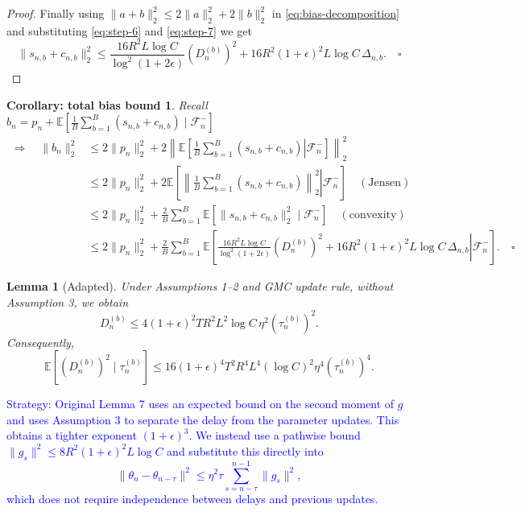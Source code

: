 \documentclass[10pt]{article}
\newcommand{\E}{\mathbb{E}}
\newcommand{\F}{\mathcal{F}}
\theoremstyle{preserved}
\newtheorem{lemma}{Lemma}
\newtheorem*{corollary}{Corollary: total bias bound}
\begin{document}
\begin{proof}
Finally using $\|a+b\|_2^2\le2\|a\|_2^2+2\|b\|_2^2$ in \eqref{eq:bias-decomposition} and substituting \eqref{eq:step-6} and \eqref{eq:step-7} we get
\begin{equation*}
\|s_{n,b}+c_{n,b}\|_2^2\le\frac{16R^2L\log C}{\log^2(1+2\epsilon)}(D_n^{(b)})^2+16R^2(1+\epsilon)^2L\log C\,\Delta_{n,b}.\quad\square
\end{equation*}
\end{proof}

\begin{corollary} Recall $b_n=p_n+\E[\frac1B\sum_{b=1}^B(s_{n,b}+c_{n,b})\mid\F_n^-]$
\begin{equation*}
\begin{aligned}
\Rightarrow\quad\|b_n\|_2^2
&\le2\|p_n\|_2^2+2\left\|\E\left[\left.\frac1B\sum_{b=1}^B(s_{n,b}+c_{n,b})\right|\F_n^-\right]\right\|_2^2\\
&\le2\|p_n\|_2^2+2\E\left[\left.\left\|\frac1B\sum_{b=1}^B(s_{n,b}+c_{n,b})\right\|_2^2\right|\F_n^-\right]\quad(\text{Jensen})\\
&\le2\|p_n\|_2^2+\frac2B\sum_{b=1}^B\E[\|s_{n,b}+c_{n,b}\|_2^2\mid\F_n^-]\quad(\text{convexity})\\
&\le2\|p_n\|_2^2+\frac2B\sum_{b=1}^B\E\left[\left.\frac{16R^2L\log C}{\log^2(1+2\epsilon)}(D_n^{(b)})^2+16R^2(1+\epsilon)^2L\log C\,\Delta_{n,b}\right|\F_n^-\right].\quad\square
\end{aligned}
\end{equation*}

\end{corollary}

\setcounter{lemma}{6}
\begin{lemma}[Adapted] Under Assumptions 1--2 and GMC update rule, without Assumption 3, we obtain
\begin{equation*}
D_n^{(b)}\le4(1+\epsilon)^2TR^2L^2\log C\,\eta^2(\tau_n^{(b)})^2.
\end{equation*}
Consequently,
\begin{equation*}
\E[(D_n^{(b)})^2\mid\tau_n^{(b)}]\le16(1+\epsilon)^4T^2R^4L^4(\log C)^2\eta^4(\tau_n^{(b)})^4.
\end{equation*}
\end{lemma}

\textcolor{blue}{Strategy: Original Lemma 7 uses an expected bound on the second moment of $g$ and uses Assumption 3 to separate the delay from the parameter updates. This obtains a tighter exponent $(1 + \epsilon)^3$. We instead use a pathwise bound $\|g_s\|^2\le 8R^2(1+\epsilon)^2L\log C$ and substitute this directly into 
$$
\|\theta_n-\theta_{n-\tau}\|^2
\le\eta^2\tau\sum_{s=n-\tau}^{n-1}\|g_s\|^2,
$$ 
which does not require independence between delays and previous updates.}
\end{document}
